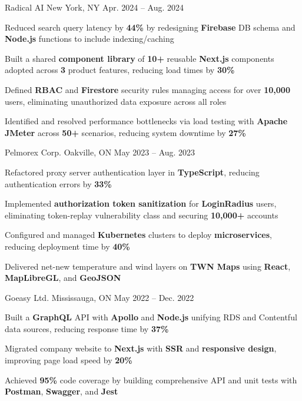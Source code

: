 \documentclass[11pt, a4paper]{awesome-cv}
\begin{document}
\begin{cventries}
  \cventry
    {\color{lightblue}{SOFTWARE ENGINEER INTERN}}
    {Radical AI}
    {New York, NY}
    {Apr. 2024 -- Aug. 2024}
    {
      \begin{cvitems}
        \item{Reduced search query latency by \textbf{44\%} by redesigning \textbf{Firebase} DB schema and \textbf{Node.js} functions to include indexing/caching}
        \item{Built a shared \textbf{component library} of \textbf{10+} reusable \textbf{Next.js} components adopted across \textbf{3} product features, reducing load times by \textbf{30\%}}
        \item{Defined \textbf{RBAC} and \textbf{Firestore} security rules managing access for over \textbf{10,000} users, eliminating unauthorized data exposure across all roles}
        \item{Identified and resolved performance bottlenecks via load testing with \textbf{Apache JMeter} across \textbf{50+} scenarios, reducing system downtime by \textbf{27\%}}
      \end{cvitems}
    }

  \vspace{3mm}

  \cventry
    {\color{lightblue}{SOFTWARE ENGINEER INTERN}}
    {Pelmorex Corp.}
    {Oakville, ON}
    {May 2023 -- Aug. 2023}
    {
      \begin{cvitems}
        \item{Refactored proxy server authentication layer in \textbf{TypeScript}, reducing authentication errors by \textbf{33\%}}
        \item{Implemented \textbf{authorization token sanitization} for \textbf{LoginRadius} users, eliminating token-replay vulnerability class and securing \textbf{10,000+} accounts}
        \item{Configured and managed \textbf{Kubernetes} clusters to deploy \textbf{microservices}, reducing deployment time by \textbf{40\%}}
        \item{Delivered net-new temperature and wind layers on \textbf{TWN Maps} using \textbf{React}, \textbf{MapLibreGL}, and \textbf{GeoJSON}}
      \end{cvitems}
    }

  \vspace{3mm}

  \cventry
    {\color{lightblue}{FRONT-END DEVELOPER INTERN}}
    {Goeasy Ltd.}
    {Mississauga, ON}
    {May 2022 -- Dec. 2022}
    {
      \begin{cvitems}
        \item{Built a \textbf{GraphQL} API with \textbf{Apollo} and \textbf{Node.js} unifying RDS and Contentful data sources, reducing response time by \textbf{37\%}}
        \item{Migrated company website to \textbf{Next.js} with \textbf{SSR} and \textbf{responsive design}, improving page load speed by \textbf{20\%}}
        \item{Achieved \textbf{95\%} code coverage by building comprehensive API and unit tests with \textbf{Postman}, \textbf{Swagger}, and \textbf{Jest}}
      \end{cvitems}
    }


\end{cventries}
\end{document}
